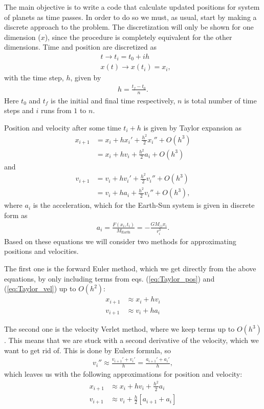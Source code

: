 \documentclass[12pt, a4paper]{article}
\begin{document}
The main objective is to write a code that calculate updated positions for system of planets as time 
passes. In order to do so we must, as usual, start by making a discrete approach to the problem. 
The discretization will only be shown for one dimension ($x$), since the procedure is completely
equivalent for the other dimensions. Time and position are discretized as 
\begin{align*}
&t  \rightarrow t_i = t_0 + ih \\
&x(t)  \rightarrow x(t_i) = x_i, 
\end{align*}   
with the time step, $h$, given by 
\begin{align*}
h = \frac{t_f - t_0}{n}.  
\end{align*}
Here $t_0$ and $t_f$ is the initial and final time respectively, $n$ is total number of time steps and 
$i$ runs from $1$ to $n$. 

Position and velocity after some time $t_i+h$ is given by Taylor expansion as 
\begin{align}
x_{i+1} & = x_i + hx_i' + \frac{h^2}{2}x_i'' + O(h^3) \\ 
	    & = x_i + hv_i + \frac{h^2}{2}a_i + O(h^3)
\label{eq:Taylor_pos}	    
\end{align}
and 
\begin{align}
v_{i+1} & = v_i + hv_i' + \frac{h^2}{2}v_i'' + O(h^3) \\
		& = v_i + ha_i + \frac{h^2}{2}v_i'' + O(h^3),  
\label{eq:Taylor_vel}
\end{align}
where $a_i$ is the acceleration, which for the Earth-Sun system is given in discrete form as  
\begin{align*}
a_i = \frac{F(x_i,t_i)}{M_{\text{Earth}}} = - \frac{GM_{\odot}x_i}{r_i^3}. 
\end{align*}
Based on these equations we will consider two methods for approximating positions and velocities.

The first one is the forward Euler method, which we get directly from the above equations, by only 
including terms from eqs. (\ref{eq:Taylor_pos}) and (\ref{eq:Taylor_vel}) up to $O(h^2)$: 
\begin{align*}
x_{i+1} & \approx x_i + hv_i \\ 
v_{i+1} & \approx v_i + ha_i 
\end{align*}

The second one is the velocity Verlet method, where we keep terms up to $O(h^3)$. This means that we are 
stuck with a second derivative of the velocity, which we want to get rid of. This is done by 
Eulers formula, so 
\begin{align*}
v_i'' \approx \frac{v_{i+1}'+v_i'}{h} = \frac{a_{i+1}'+a_i'}{h},  
\end{align*}
which leaves us with the following approximations for position and velocity: 
\begin{align*}
x_{i+1} & \approx x_i + hv_i + \frac{h^2}{2}a_i  \\
v_{i+1} & \approx v_i + \frac{h}{2}\left[ a_{i+1} + a_i  \right] 
\end{align*}
\end{document}
